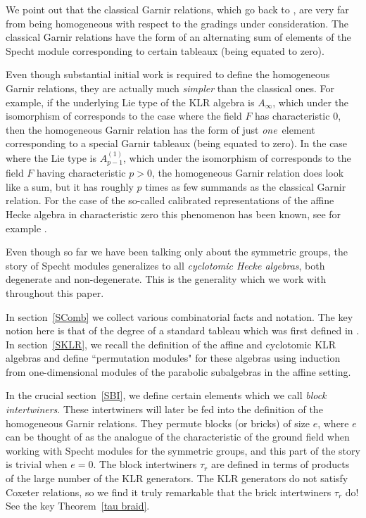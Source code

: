 \documentclass[twoside,11pt,reqno]{amsart}
\numberwithin{equation}{section}
\theoremstyle{definition}  %
\newcommand{\0}{{\bar 0}}
\newcommand{\1}{{\bar 1}}
\begin{document}
We point out that the classical Garnir relations, which go back to \cite{Young2,Garnir}, are very far
from being homogeneous with respect to the gradings under consideration. 
The classical Garnir relations have the form of an alternating sum of elements of the Specht
module corresponding to certain tableaux (being equated to zero). 

Even though substantial initial work is required to define the homogeneous Garnir relations, they are actually much {\em simpler} than the classical ones. For example, if the underlying Lie type of the KLR algebra is $A_{\infty}$, which under the isomorphism of \cite{BK} corresponds to the case where the field $F$ has characteristic $0$, then the homogeneous Garnir relation has the form of just {\em one}\, element corresponding to a special Garnir tableaux (being equated to zero). In the case where the Lie type is $A_{p-1}^{(1)}$, which under the isomorphism of \cite{BK} corresponds to the field $F$ having characteristic $p>0$, the homogeneous Garnir relation does look like a sum, but it has roughly $p$ times as few summands as the classical Garnir relation. For the case of the so-called calibrated representations of the affine Hecke algebra in characteristic zero this phenomenon has been known, see for example \cite[(5.4)]{Ram}. 

Even though so far we have been talking only about the symmetric groups, the story of Specht modules generalizes to all {\em cyclotomic Hecke algebras}, both 
degenerate and non-degenerate. This is the generality which we work with throughout this
paper. 


In section~\ref{SComb} we collect various combinatorial facts and notation. The key notion
here is that of the degree of a standard tableau which was first defined in \cite{BKW}. In
section~\ref{SKLR}, we recall the definition of the affine and cyclotomic KLR algebras and
define ``permutation modules" for these algebras using induction from one-dimensional modules
of the parabolic subalgebras in the affine setting. 

In the crucial section~\ref{SBI}, we define certain elements which we call {\em block
intertwiners}. These intertwiners will later be fed into the definition of the homogeneous
Garnir relations. They permute blocks (or bricks) of size $e$, where $e$ can be thought of as
the analogue of the characteristic of the ground field when working with Specht modules for the
symmetric groups, and this part of the story is trivial when $e=0$. The block intertwiners
$\tau_r$ are defined in terms of products of the large number  of the KLR generators. The KLR
generators do not satisfy Coxeter relations, so we find it truly remarkable that the brick
intertwiners $\tau_r$ do! See the key Theorem~\ref{tau braid}. 
\end{document}
